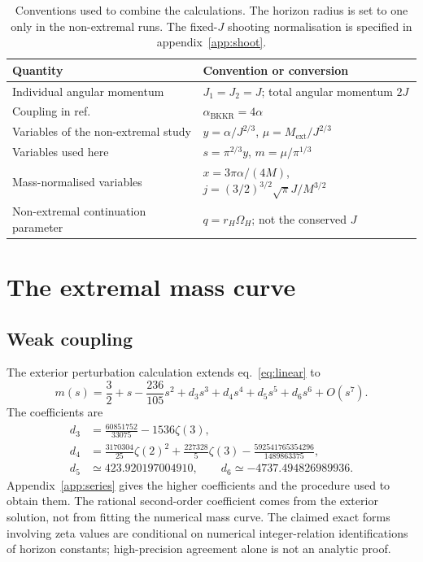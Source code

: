 \documentclass[11pt,a4paper]{article}
\newcommand{\ext}{\mathrm{ext}}
\newcommand{\z}{\zeta}
\begin{document}
\begin{table}[t]
\centering\small
\begin{tabular}{@{}ll@{}}\toprule
Quantity & Convention or conversion\\\midrule
Individual angular momentum & $J_1=J_2=J$; total angular momentum $2J$\\
Coupling in ref.~\cite{Brihaye2010} & $\alpha_{\mathrm{BKKR}}=4\alpha$\\
Variables of the non-extremal study & $y=\alpha/J^{2/3}$, $\mu=M_\ext/J^{2/3}$\\
Variables used here & $s=\pi^{2/3}y$, $m=\mu/\pi^{1/3}$\\
Mass-normalised variables \cite{KKR2023} & $x=3\pi\alpha/(4M)$, $j=(3/2)^{3/2}\sqrt\pi J/M^{3/2}$\\
Non-extremal continuation parameter & $q=r_H\Omega_H$; not the conserved $J$\\\bottomrule
\end{tabular}
\caption{Conventions used to combine the calculations. The horizon radius is set to one only in the non-extremal runs. The fixed-$J$ shooting normalisation is specified in appendix~\ref{app:shoot}.}
\label{tab:conventions}
\end{table}

\section{The extremal mass curve}
\subsection{Weak coupling}
The exterior perturbation calculation extends eq.~\eqref{eq:linear} to
\begin{equation}
 m(s)=\frac32+s-\frac{236}{105}s^2+d_3s^3+d_4s^4+d_5s^5+d_6s^6+O(s^7).
 \label{eq:weak}
\end{equation}
The coefficients are
\begin{align}
 d_3&=\frac{60851752}{33075}-1536\z(3),\nonumber\\
 d_4&=\frac{3170304}{25}\z(2)^2+\frac{227328}{5}\z(3)
       -\frac{592541765354296}{1489863375},\label{eq:d34}\\
 d_5&\simeq423.920197004910,\qquad d_6\simeq-4737.494826989936.\nonumber
\end{align}
Appendix~\ref{app:series} gives the higher coefficients and the procedure used to obtain them. The rational second-order coefficient comes from the exterior solution, not from fitting the numerical mass curve. The claimed exact forms involving zeta values are conditional on numerical integer-relation identifications of horizon constants; high-precision agreement alone is not an analytic proof.
\end{document}
